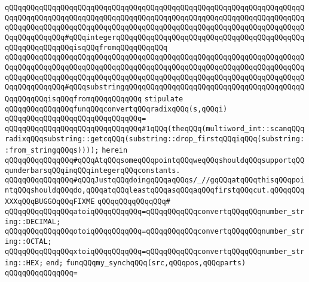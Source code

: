 \verb|qQQqqQQqqQQqqQQqqQQqqQQqqQQqqQQqqQQqqQQqqQQqqQQqqQQqqQQqqQQqqQQqqQQqqQQqqQQqqQQqqQQqqQQqqQQqqQQqqQQqqQQqqQQqqQQqqQQqqQQqqQQqqQQqqQQqqQQqqQQqqQQqqQQqqQQqqQQqqQQqqQQqqQQqqQQqqQQqqQQqqQQqqQQqqQQqqQQqqQQqqQQqqQQqqQQqqQQqqQQqqQQq#qQQqintegerqQQqqQQqqQQqqQQqqQQqqQQqqQQqqQQqqQQqqQQqqQQqqQQqqQQqqQQqqQQqisqQQqfromqQQqqQQqqQQq|\newline
\verb|qQQqqQQqqQQqqQQqqQQqqQQqqQQqqQQqqQQqqQQqqQQqqQQqqQQqqQQqqQQqqQQqqQQqqQQqqQQqqQQqqQQqqQQqqQQqqQQqqQQqqQQqqQQqqQQqqQQqqQQqqQQqqQQqqQQqqQQqqQQqqQQqqQQqqQQqqQQqqQQqqQQqqQQqqQQqqQQqqQQqqQQqqQQqqQQqqQQqqQQqqQQqqQQqqQQqqQQqqQQqqQQq#qQQqsubstringqQQqqQQqqQQqqQQqqQQqqQQqqQQqqQQqqQQqqQQqqQQqqQQqqQQqisqQQqfromqQQqqQQqqQQq|\newline
\verb|stipulate|\newline
\newline
\verb|qQQqqQQqqQQqqQQqfunqQQqconvertqQQqradixqQQq(s,qQQqi)|\newline
\verb|qQQqqQQqqQQqqQQqqQQqqQQqqQQqqQQq=|\newline
\verb|qQQqqQQqqQQqqQQqqQQqqQQqqQQqqQQq#1qQQq(theqQQq(multiword_int::scanqQQqradixqQQqsubstring::getcqQQq(substring::drop_firstqQQqiqQQq(substring::from_stringqQQqs))));|\newline
\verb|herein|\newline
\verb|qQQqqQQqqQQqqQQq#qQQqAtqQQqsomeqQQqpointqQQqweqQQqshouldqQQqsupportqQQqunderbarsqQQqinqQQqintegerqQQqconstants.|\newline
\verb|qQQqqQQqqQQqqQQq#qQQqJustqQQqdoingqQQqaqQQqs/_//gqQQqatqQQqthisqQQqpointqQQqshouldqQQqdo,qQQqatqQQqleastqQQqasqQQqaqQQqfirstqQQqcut.qQQqqQQqXXXqQQqBUGGOqQQqFIXME|\newline
\verb|qQQqqQQqqQQqqQQq#|\newline
\verb|qQQqqQQqqQQqqQQqatoiqQQqqQQqqQQq=qQQqqQQqqQQqconvertqQQqqQQqnumber_string::DECIMAL;|\newline
\verb|qQQqqQQqqQQqqQQqotoiqQQqqQQqqQQq=qQQqqQQqqQQqconvertqQQqqQQqnumber_string::OCTAL;|\newline
\verb|qQQqqQQqqQQqqQQqxtoiqQQqqQQqqQQq=qQQqqQQqqQQqconvertqQQqqQQqnumber_string::HEX;|\newline
\verb|end;|\newline
\newline
\verb|funqQQqmy_synchqQQq(src,qQQqpos,qQQqparts)|\newline
\verb|qQQqqQQqqQQqqQQq=|\newline
